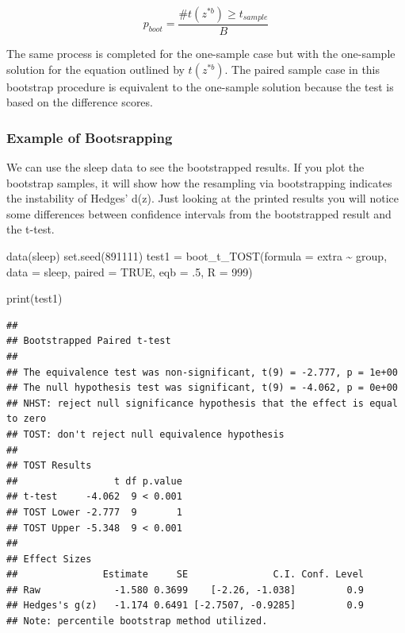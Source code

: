 \documentclass[]{interact}
\theoremstyle{plain}%
\theoremstyle{definition}
\theoremstyle{remark}
\newenvironment{Shaded}{\begin{snugshade}}{\end{snugshade}}
\newcommand{\AttributeTok}[1]{\textcolor[rgb]{0.77,0.63,0.00}{#1}}
\newcommand{\ConstantTok}[1]{\textcolor[rgb]{0.00,0.00,0.00}{#1}}
\newcommand{\DecValTok}[1]{\textcolor[rgb]{0.00,0.00,0.81}{#1}}
\newcommand{\FunctionTok}[1]{\textcolor[rgb]{0.00,0.00,0.00}{#1}}
\newcommand{\NormalTok}[1]{#1}
\newcommand{\OtherTok}[1]{\textcolor[rgb]{0.56,0.35,0.01}{#1}}
\newcommand{\SpecialCharTok}[1]{\textcolor[rgb]{0.00,0.00,0.00}{#1}}
\newcommand{\StringTok}[1]{\textcolor[rgb]{0.31,0.60,0.02}{#1}}
\begin{document}
\[
p_{boot} = \frac {\#t(z^{*b}) \ge t_{sample}}{B}
\]

The same process is completed for the one-sample case but with the
one-sample solution for the equation outlined by \(t(z^{*b})\). The
paired sample case in this bootstrap procedure is equivalent to the
one-sample solution because the test is based on the difference scores.

\hypertarget{example-of-bootsrapping}{%
\subsubsection{Example of Bootsrapping}\label{example-of-bootsrapping}}

We can use the sleep data to see the bootstrapped results. If you plot
the bootstrap samples, it will show how the resampling via bootstrapping
indicates the instability of Hedges' d(z). Just looking at the printed
results you will notice some differences between confidence intervals
from the bootstrapped result and the t-test.

\begin{Shaded}
\begin{Highlighting}[]
\FunctionTok{data}\NormalTok{(}\StringTok{\textquotesingle{}sleep\textquotesingle{}}\NormalTok{)}
\FunctionTok{set.seed}\NormalTok{(}\DecValTok{891111}\NormalTok{)}
\NormalTok{test1 }\OtherTok{=} \FunctionTok{boot\_t\_TOST}\NormalTok{(}\AttributeTok{formula =}\NormalTok{ extra }\SpecialCharTok{\textasciitilde{}}\NormalTok{ group,}
                    \AttributeTok{data =}\NormalTok{ sleep,}
                    \AttributeTok{paired =} \ConstantTok{TRUE}\NormalTok{,}
                    \AttributeTok{eqb =}\NormalTok{ .}\DecValTok{5}\NormalTok{,}
                    \AttributeTok{R =} \DecValTok{999}\NormalTok{)}


\FunctionTok{print}\NormalTok{(test1)}
\end{Highlighting}
\end{Shaded}

\begin{verbatim}
## 
## Bootstrapped Paired t-test
## 
## The equivalence test was non-significant, t(9) = -2.777, p = 1e+00
## The null hypothesis test was significant, t(9) = -4.062, p = 0e+00
## NHST: reject null significance hypothesis that the effect is equal to zero 
## TOST: don't reject null equivalence hypothesis
## 
## TOST Results 
##                 t df p.value
## t-test     -4.062  9 < 0.001
## TOST Lower -2.777  9       1
## TOST Upper -5.348  9 < 0.001
## 
## Effect Sizes 
##               Estimate     SE               C.I. Conf. Level
## Raw             -1.580 0.3699    [-2.26, -1.038]         0.9
## Hedges's g(z)   -1.174 0.6491 [-2.7507, -0.9285]         0.9
## Note: percentile bootstrap method utilized.
\end{verbatim}
\end{document}
